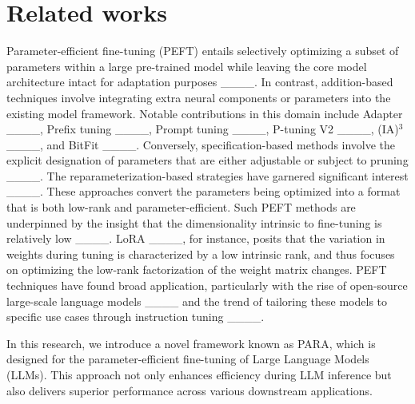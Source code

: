 \section{Related works}
Parameter-efficient fine-tuning (PEFT) entails selectively optimizing a subset of parameters within a large pre-trained model while leaving the core model architecture intact for adaptation purposes ____. In contrast, addition-based techniques involve integrating extra neural components or parameters into the existing model framework. Notable contributions in this domain include Adapter ____, Prefix tuning ____, Prompt tuning ____, P-tuning V2 ____, (IA)$^{3}$ ____, and BitFit ____. Conversely, specification-based methods involve the explicit designation of parameters that are either adjustable or subject to pruning ____. The reparameterization-based strategies have garnered significant interest ____. These approaches convert the parameters being optimized into a format that is both low-rank and parameter-efficient. Such PEFT methods are underpinned by the insight that the dimensionality intrinsic to fine-tuning is relatively low ____. LoRA ____, for instance, posits that the variation in weights during tuning is characterized by a low intrinsic rank, and thus focuses on optimizing the low-rank factorization of the weight matrix changes. PEFT techniques have found broad application, particularly with the rise of open-source large-scale language models ____ and the trend of tailoring these models to specific use cases through instruction tuning ____.


In this research, we introduce a novel framework known as PARA, which is designed for the parameter-efficient fine-tuning of Large Language Models (LLMs). This approach not only enhances efficiency during LLM inference but also delivers superior performance across various downstream applications.